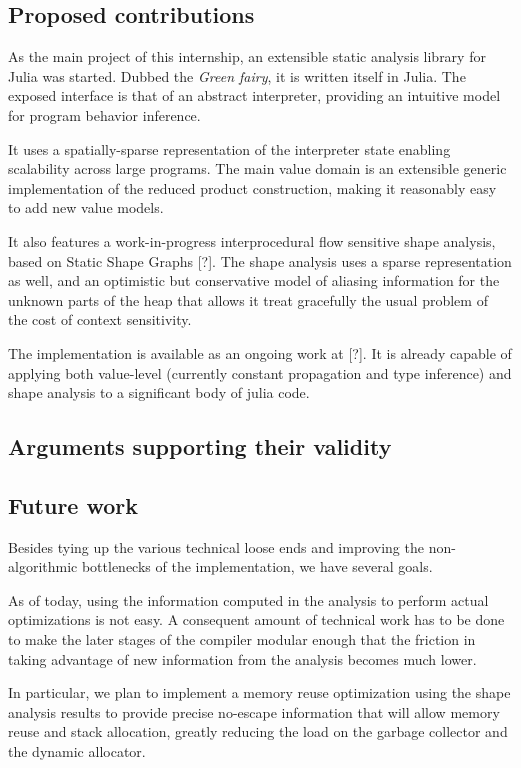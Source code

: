 \documentclass[11pt]{article}
\begin{document}
\subsection*{Proposed contributions}

As the main project of this internship, an extensible static analysis library for Julia was started. Dubbed the \emph{Green fairy}, it is written itself in Julia. The exposed interface is that of an abstract interpreter, providing an intuitive model for program behavior inference.

It uses a spatially-sparse representation of the interpreter state enabling scalability across large programs. The main value domain is an extensible generic implementation of the reduced product construction, making it reasonably easy to add new value models.

It also features a work-in-progress interprocedural flow sensitive shape analysis, based on Static Shape Graphs [?]. The shape analysis uses a sparse representation as well, and an optimistic but conservative model of aliasing information for the unknown parts of the heap that allows it treat gracefully the usual problem of the cost of context sensitivity.

The implementation is available as an ongoing work at [?]. It is already capable of applying both value-level (currently constant propagation and type inference) and shape analysis to a significant body of julia code.

\subsection*{Arguments supporting their validity}



\subsection*{Future work}

Besides tying up the various technical loose ends and improving the non-algorithmic bottlenecks of the implementation, we have several goals.

As of today, using the information computed in the analysis to perform actual optimizations is not easy.
A consequent amount of technical work has to be done to make the later stages of the compiler modular enough that the friction in taking advantage of new information from the analysis becomes much lower.

In particular, we plan to implement a memory reuse optimization using the shape analysis results to provide precise no-escape information that will allow memory reuse and stack allocation, greatly reducing the load on the garbage collector and the dynamic allocator.
\end{document}
